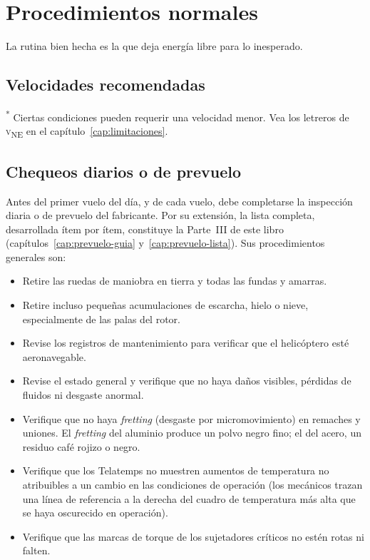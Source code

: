 \chapter{Procedimientos normales}
\label{cap:normales}

\opening{La rutina bien hecha es la que deja energía libre para lo inesperado.}

\section{Velocidades recomendadas}

\begin{checklist}
\end{checklist}

{\footnotesize\textsuperscript{*} Ciertas condiciones pueden requerir una velocidad menor. Vea los letreros de \textsc{v}\textsubscript{NE} en el capítulo~\ref{cap:limitaciones}.}

\section{Chequeos diarios o de prevuelo}

Antes del primer vuelo del día, y de cada vuelo, debe completarse la inspección diaria o de prevuelo del fabricante. Por su extensión, la lista completa, desarrollada ítem por ítem, constituye la Parte~III de este libro (capítulos~\ref{cap:prevuelo-guia} y~\ref{cap:prevuelo-lista}). Sus procedimientos generales son:

\begin{itemize}
\item Retire las ruedas de maniobra en tierra y todas las fundas y amarras.
\item Retire incluso pequeñas acumulaciones de escarcha, hielo o nieve, especialmente de las palas del rotor.
\item Revise los registros de mantenimiento para verificar que el helicóptero esté aeronavegable.
\item Revise el estado general y verifique que no haya daños visibles, pérdidas de fluidos ni desgaste anormal.
\item Verifique que no haya \emph{fretting} (desgaste por micromovimiento) en remaches y uniones. El \emph{fretting} del aluminio produce un polvo negro fino; el del acero, un residuo café rojizo o negro.
\item Verifique que los Telatemps no muestren aumentos de temperatura no atribuibles a un cambio en las condiciones de operación (los mecánicos trazan una línea de referencia a la derecha del cuadro de temperatura más alta que se haya oscurecido en operación).
\item Verifique que las marcas de torque de los sujetadores críticos no estén rotas ni falten.
\end{itemize}

